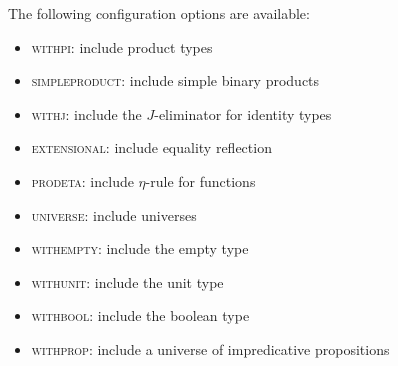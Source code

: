
The following configuration options are available:
%
\begin{itemize}
\item \textsc{withpi}: include product types
\item \textsc{simpleproduct}: include simple binary products
\item \textsc{withj}: include the $J$-eliminator for identity types
\item \textsc{extensional}: include equality reflection
\item \textsc{prodeta}: include $\eta$-rule for functions
\item \textsc{universe}: include universes
\item \textsc{withempty}: include the empty type
\item \textsc{withunit}: include the unit type
\item \textsc{withbool}: include the boolean type
\item \textsc{withprop}: include a universe of impredicative propositions
\end{itemize}
